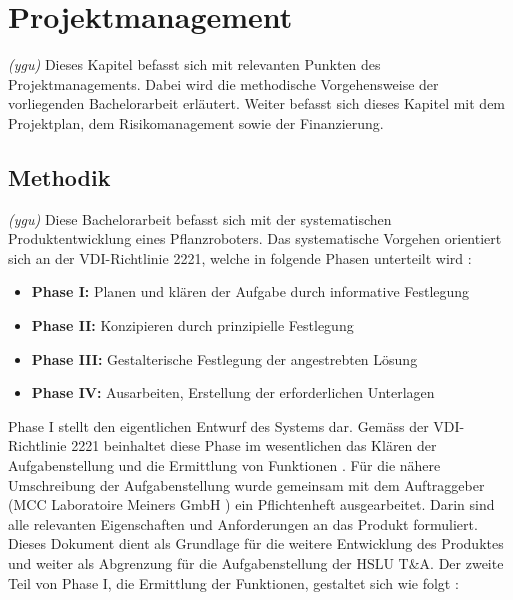 \newpage
\section{Projektmanagement}
\textit{(ygu)} Dieses Kapitel befasst sich mit relevanten Punkten des Projektmanagements. Dabei wird die methodische Vorgehensweise der vorliegenden Bachelorarbeit erläutert. Weiter befasst sich dieses Kapitel mit dem Projektplan, dem Risikomanagement sowie der Finanzierung. 
\subsection{Methodik}
\label{methodik}
\textit{(ygu)} Diese Bachelorarbeit befasst sich mit der systematischen Produktentwicklung eines Pflanzroboters. Das systematische Vorgehen orientiert sich  an der VDI-Richtlinie 2221, welche in folgende Phasen unterteilt wird \cite{naefe}:

\begin{itemize}
	\item \textbf{Phase I:} Planen und klären der Aufgabe durch informative Festlegung
	
	\item \textbf{Phase II:} Konzipieren durch prinzipielle Festlegung
	
	\item \textbf{Phase III:} Gestalterische Festlegung der angestrebten Lösung
	
	\item \textbf{Phase IV:} Ausarbeiten, Erstellung der erforderlichen Unterlagen
	
\end{itemize}

Phase I stellt den eigentlichen Entwurf des Systems dar. Gemäss der VDI-Richtlinie 2221 beinhaltet diese Phase im wesentlichen das Klären der Aufgabenstellung und die Ermittlung von Funktionen \cite{vdi2221}. Für die nähere Umschreibung der Aufgabenstellung wurde gemeinsam mit dem Auftraggeber (MCC Laboratoire Meiners GmbH ) ein Pflichtenheft ausgearbeitet. Darin sind alle relevanten Eigenschaften und Anforderungen an das Produkt formuliert. Dieses Dokument dient als Grundlage für die weitere Entwicklung des Produktes und weiter als Abgrenzung für die Aufgabenstellung der HSLU T\&A. Der zweite Teil von Phase I, die Ermittlung der Funktionen, gestaltet sich wie folgt \cite{pahl}:

